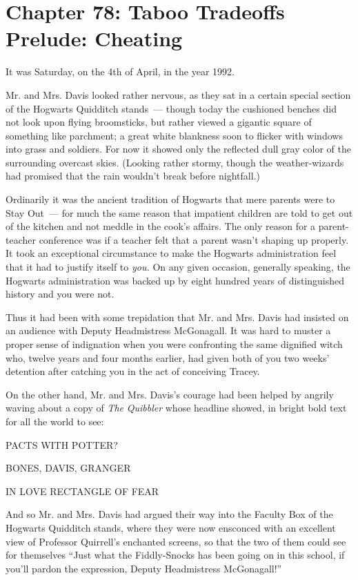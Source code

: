 \chapter{Chapter 78: Taboo Tradeoffs Prelude: Cheating}
It was Saturday, on the 4th of April, in the year 1992.

Mr. and Mrs. Davis looked rather nervous, as they sat in a certain special section of the Hogwarts Quidditch stands~--- though today the cushioned benches did not look upon flying broomsticks, but rather viewed a gigantic square of something like parchment; a great white blankness soon to flicker with windows into grass and soldiers. For now it showed only the reflected dull gray color of the surrounding overcast skies. (Looking rather stormy, though the weather-wizards had promised that the rain wouldn't break before nightfall.)

Ordinarily it was the ancient tradition of Hogwarts that mere parents were to Stay Out~--- for much the same reason that impatient children are told to get out of the kitchen and not meddle in the cook's affairs. The only reason for a parent-teacher conference was if a teacher felt that a parent wasn't shaping up properly. It took an exceptional circumstance to make the Hogwarts administration feel that it had to justify itself to \emph{you.} On any given occasion, generally speaking, the Hogwarts administration was backed up by eight hundred years of distinguished history and you were not.

Thus it had been with some trepidation that Mr. and Mrs. Davis had insisted on an audience with Deputy Headmistress McGonagall. It was hard to muster a proper sense of indignation when you were confronting the same dignified witch who, twelve years and four months earlier, had given both of you two weeks' detention after catching you in the act of conceiving Tracey.

On the other hand, Mr. and Mrs. Davis's courage had been helped by angrily waving about a copy of \emph{The} \emph{Quibbler} whose headline showed, in bright bold text for all the world to see:

PACTS WITH POTTER?

BONES, DAVIS, GRANGER

IN LOVE RECTANGLE OF FEAR

And so Mr. and Mrs. Davis had argued their way into the Faculty Box of the Hogwarts Quidditch stands, where they were now ensconced with an excellent view of Professor Quirrell's enchanted screens, so that the two of them could see for themselves ``Just what the Fiddly-Snocks has been going on in this school, if you'll pardon the expression, Deputy Headmistress McGonagall!''

